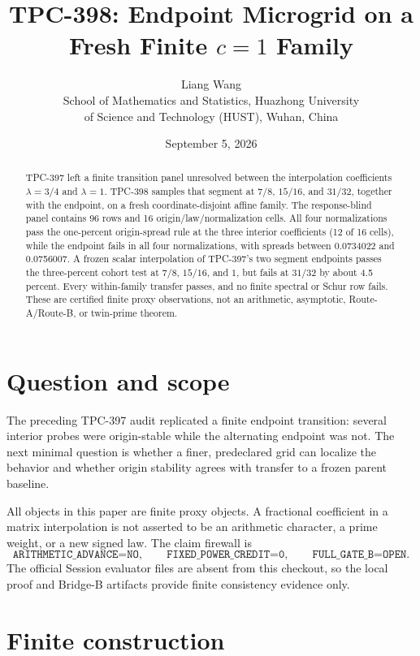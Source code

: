 \documentclass[10pt]{article}
\title{TPC-398: Endpoint Microgrid on a Fresh Finite \(c=1\) Family}
\author{Liang Wang\\
School of Mathematics and Statistics, Huazhong University\\
of Science and Technology (HUST), Wuhan, China}
\date{September 5, 2026}
\begin{document}
\maketitle

\begin{abstract}
TPC-397 left a finite transition panel unresolved between the interpolation
coefficients \(\lambda=3/4\) and \(\lambda=1\).  TPC-398 samples that segment
at \(7/8\), \(15/16\), and \(31/32\), together with the endpoint, on a fresh
coordinate-disjoint affine family.  The response-blind panel contains 96 rows
and 16 origin/law/normalization cells.  All four normalizations pass the
one-percent origin-spread rule at the three interior coefficients (12 of 16
cells), while the endpoint fails in all four normalizations, with spreads
between 0.0734022 and 0.0756007.  A frozen scalar interpolation of TPC-397's
two segment endpoints passes the three-percent cohort test at \(7/8\),
\(15/16\), and \(1\), but fails at \(31/32\) by about 4.5 percent.  Every
within-family transfer passes, and no finite spectral or Schur row fails.
These are certified finite proxy observations, not an arithmetic, asymptotic,
Route-A/Route-B, or twin-prime theorem.
\end{abstract}

\section{Question and scope}

The preceding TPC-397 audit replicated a finite endpoint transition: several
interior probes were origin-stable while the alternating endpoint was not.  The
next minimal question is whether a finer, predeclared grid can localize the
behavior and whether origin stability agrees with transfer to a frozen parent
baseline.

All objects in this paper are finite proxy objects.  A fractional coefficient
in a matrix interpolation is not asserted to be an arithmetic character, a
prime weight, or a new signed law.  The claim firewall is
\[
 \texttt{ARITHMETIC\_ADVANCE=NO},\qquad
 \texttt{FIXED\_POWER\_CREDIT=0},\qquad
 \texttt{FULL\_GATE\_B=OPEN}.
\]
The official Session evaluator files are absent from this checkout, so the
local proof and Bridge-B artifacts provide finite consistency evidence only.

\section{Finite construction}
\end{document}
